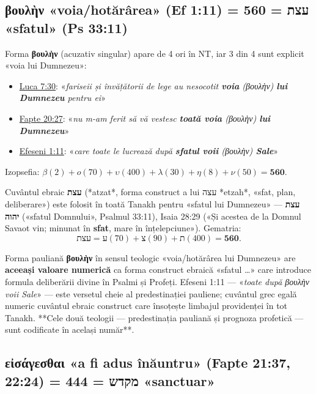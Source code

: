 \documentclass[12pt,a4paper,twoside,openany]{book}
\begin{document}
\subsection{βουλὴν «voia/hotărârea» (Ef 1:11) = 560 = עצת «sfatul» (Ps 33:11)}

Forma \textbf{βουλὴν} (acuzativ singular) apare de 4 ori în NT, iar 3 din 4 sunt explicit «voia lui Dumnezeu»:

\begin{itemize}
  \item \href{https://bibliaortodoxa.ro/carte.php?id=48\&cap=7\#30}{Luca 7:30}: «\textit{fariseii și învățătorii de lege au nesocotit \textbf{voia} (βουλὴν) \textbf{lui Dumnezeu} pentru ei}»
  \item \href{https://bibliaortodoxa.ro/carte.php?id=26\&cap=20\#27}{Fapte 20:27}: «\textit{nu m-am ferit să vă vestesc \textbf{toată voia} (βουλὴν) \textbf{lui Dumnezeu}}»
  \item \href{https://bibliaortodoxa.ro/carte.php?id=76\&cap=1\#11}{Efeseni 1:11}: «\textit{care toate le lucrează după \textbf{sfatul voii} (βουλὴν) \textbf{Sale}}»
\end{itemize}

Izopsefia: $\beta(2) + o(70) + \upsilon(400) + \lambda(30) + \eta(8) + \nu(50) = \mathbf{560}$.

Cuvântul ebraic \textbf{עצת} (*atzat*, forma construct a lui עצה *etzah*, «sfat, plan, deliberare») este folosit în toată Tanakh pentru «sfatul lui Dumnezeu» — \textbf{עצת יהוה} («sfatul Domnului», Psalmul 33:11), Isaia 28:29 («Și acestea de la Domnul Savaot vin; minunat în \textbf{sfat}, mare în înțelepciune»). Gematria:
\[
\text{עצת} = \text{ע}(70) + \text{צ}(90) + \text{ת}(400) = \mathbf{560}.
\]

Forma pauliană \textbf{βουλὴν} în sensul teologic «voia/hotărârea lui Dumnezeu» are \textbf{aceeași valoare numerică} ca forma construct ebraică «sfatul \ldots» care introduce formula deliberării divine în Psalmi și Profeți. Efeseni 1:11 — «\textit{toate după βουλὴν voii Sale}» — este versetul cheie al predestinației pauliene; cuvântul grec egală numeric cuvântul ebraic construct care însoțește limbajul providenței în tot Tanakh. **Cele două teologii — predestinația pauliană și prognoza profetică — sunt codificate în același număr**.

\subsection{εἰσάγεσθαι «a fi adus înăuntru» (Fapte 21:37, 22:24) = 444 = מקדש «sanctuar»}
\end{document}
